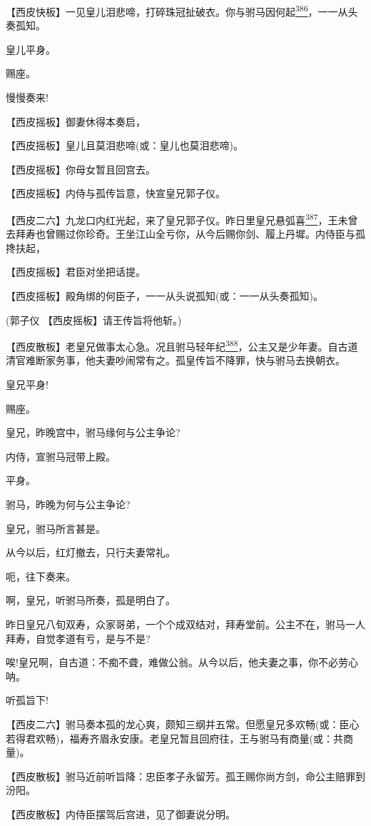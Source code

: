 【西皮快板】一见皇儿泪悲啼，打碎珠冠扯破衣。你与驸马因何起\protect\hyperlink{fn386}{\textsuperscript{386}}，一一从头奏孤知。

皇儿平身。

赐座。

慢慢奏来!

【西皮摇板】御妻休得本奏启，

【西皮摇板】皇儿且莫泪悲啼(或：皇儿也莫泪悲啼)。

【西皮摇板】你母女暂且回宫去。

【西皮摇板】内侍与孤传旨意，快宣皇兄郭子仪。

【西皮二六】九龙口内红光起，来了皇兄郭子仪。昨日里皇兄悬弧喜\protect\hyperlink{fn387}{\textsuperscript{387}}，王未曾去拜寿也曾赐过你珍奇。王坐江山全亏你，从今后赐你剑、履上丹墀。内侍臣与孤搀扶起，

【西皮摇板】君臣对坐把话提。

【西皮摇板】殿角绑的何臣子，一一从头说孤知(或：一一从头奏孤知)。

(郭子仪 【西皮摇板】请王传旨将他斩。)

【西皮散板】老皇兄做事太心急。况且驸马轻年纪\protect\hyperlink{fn388}{\textsuperscript{388}}，公主又是少年妻。自古道清官难断家务事，他夫妻吵闹常有之。孤皇传旨不降罪，快与驸马去换朝衣。

皇兄平身!

赐座。

皇兄，昨晚宫中，驸马缘何与公主争论?

内侍，宣驸马冠带上殿。

平身。

驸马，昨晚为何与公主争论?

皇兄，驸马所言甚是。

从今以后，红灯撤去，只行夫妻常礼。

呃，往下奏来。

啊，皇兄，听驸马所奏，孤是明白了。

昨日皇兄八旬双寿，众家哥弟，一个个成双结对，拜寿堂前。公主不在，驸马一人拜寿，自觉孝道有亏，是与不是?

唉!皇兄啊，自古道：不痴不聋，难做公翁。从今以后，他夫妻之事，你不必劳心呐。

听孤旨下!

【西皮二六】驸马奏本孤的龙心爽，颇知三纲并五常。但愿皇兄多欢畅(或：臣心若得君欢畅)，福寿齐眉永安康。老皇兄暂且回府往，王与驸马有商量(或：共商量)。

【西皮散板】驸马近前听旨降：忠臣孝子永留芳。孤王赐你尚方剑，命公主赔罪到汾阳。

【西皮散板】内侍臣摆驾后宫进，见了御妻说分明。

